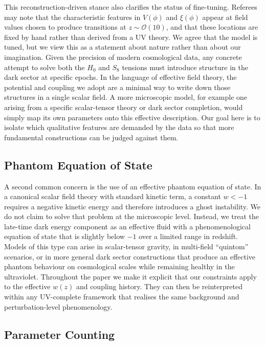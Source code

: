 \documentclass[twocolumn,showpacs,preprintnumbers,amsmath,amssymb,prd]{revtex4-2}
\begin{document}
This reconstruction-driven stance also clarifies the status of fine-tuning. Referees may note that the characteristic features in $V(\phi)$ and $\xi(\phi)$ appear at field values chosen to produce transitions at $z \sim \mathcal{O}(10)$, and that these locations are fixed by hand rather than derived from a UV theory. We agree that the model is tuned, but we view this as a statement about nature rather than about our imagination. Given the precision of modern cosmological data, any concrete attempt to solve both the $H_0$ and $S_8$ tensions must introduce structure in the dark sector at specific epochs. In the language of effective field theory, the potential and coupling we adopt are a minimal way to write down those structures in a single scalar field. A more microscopic model, for example one arising from a specific scalar-tensor theory or dark sector completion, would simply map its own parameters onto this effective description. Our goal here is to isolate which qualitative features are demanded by the data so that more fundamental constructions can be judged against them.

\subsection{Phantom Equation of State}

A second common concern is the use of an effective phantom equation of state. In a canonical scalar field theory with standard kinetic term, a constant $w < -1$ requires a negative kinetic energy and therefore introduces a ghost instability. We do not claim to solve that problem at the microscopic level. Instead, we treat the late-time dark energy component as an effective fluid with a phenomenological equation of state that is slightly below $-1$ over a limited range in redshift. Models of this type can arise in scalar-tensor gravity, in multi-field ``quintom'' scenarios, or in more general dark sector constructions that produce an effective phantom behaviour on cosmological scales while remaining healthy in the ultraviolet. Throughout the paper we make it explicit that our constraints apply to the effective $w(z)$ and coupling history. They can then be reinterpreted within any UV-complete framework that realises the same background and perturbation-level phenomenology.

\subsection{Parameter Counting}
\end{document}
